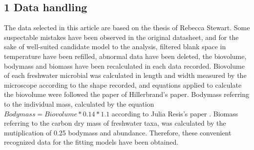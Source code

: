 \documentclass[11pt]{article}
\begin{document}
\begin{linenumbers}
\section*{1 Data handling}
The data selected in this article are based on the thesis of Rebecca Stewart.
Some suspectable mistakes have been observed in the original datasheet, and for the sake of well-suited candidate model to the analysis, filtered blank space in temperature have been refilled, abnormal data have been deleted, the biovolume, bodymass and biomass have been recalculated in each data recorded.
Biovolume of each freshwater microbial was calculated in length and width measured by the microscope according to the shape recorded, and equations applied to calculate the biovolume were followed the paper of Hillerbrand's paper\cite{hillebrand1999biovolume}.
Bodymass referring to the individual mass, calculated by the equation $Bodymass = Biovolume * 0.14 * 1.1 $ according to Julia Resis's paper \cite{reiss2008existing}.
Biomass referring to the carbon dry mass of freshwater taxa, was calculated by the mutiplication of 0.25 bodymass and abundance.
Therefore, these convenient recognized data for the fitting models have been obtained.


\end{linenumbers}
\end{document}
